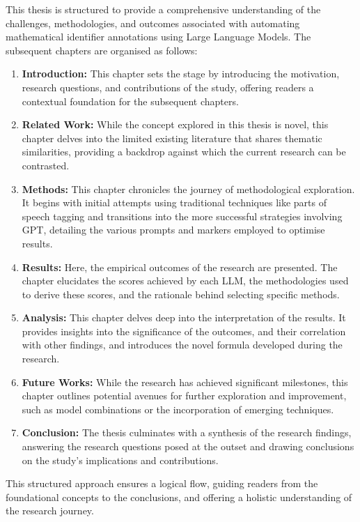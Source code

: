 This thesis is structured to provide a comprehensive understanding of the challenges, methodologies, and outcomes associated with automating mathematical identifier annotations using Large Language Models. The subsequent chapters are organised as follows:

\begin{enumerate}
    \item \textbf{Introduction:} This chapter sets the stage by introducing the motivation, research questions, and contributions of the study, offering readers a contextual foundation for the subsequent chapters.
    
    \item \textbf{Related Work:} While the concept explored in this thesis is novel, this chapter delves into the limited existing literature that shares thematic similarities, providing a backdrop against which the current research can be contrasted.
    
    \item \textbf{Methods:} This chapter chronicles the journey of methodological exploration. It begins with initial attempts using traditional techniques like parts of speech tagging and transitions into the more successful strategies involving GPT, detailing the various prompts and markers employed to optimise results.
    
    \item \textbf{Results:} Here, the empirical outcomes of the research are presented. The chapter elucidates the scores achieved by each LLM, the methodologies used to derive these scores, and the rationale behind selecting specific methods.
    
    \item \textbf{Analysis:} This chapter delves deep into the interpretation of the results. It provides insights into the significance of the outcomes, and their correlation with other findings, and introduces the novel formula developed during the research.
    
    \item \textbf{Future Works:} While the research has achieved significant milestones, this chapter outlines potential avenues for further exploration and improvement, such as model combinations or the incorporation of emerging techniques.
    
    \item \textbf{Conclusion:} The thesis culminates with a synthesis of the research findings, answering the research questions posed at the outset and drawing conclusions on the study's implications and contributions.
\end{enumerate}

This structured approach ensures a logical flow, guiding readers from the foundational concepts to the conclusions, and offering a holistic understanding of the research journey.


